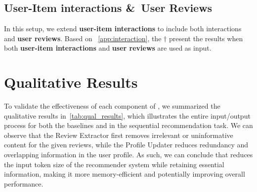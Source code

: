 \subsection{User-Item interactions \&\ User Reviews}
\label{app:combined}
In this setup, we extend \textbf{user-item interactions} to include both interactions and \textbf{user reviews}. Based on ~\cref{app:interaction}, the $\dagger$ present the results when both \textbf{user-item interactions} and \textbf{user reviews} are used as input.



\section{Qualitative Results}
\label{app:qual}
To validate the effectiveness of each component of \myalg{}, we summarized the qualitative results in~\autoref{tab:qual_results}, which illustrates the entire input/output process for both the baselines and \myalg{} in the sequential recommendation task. We can observe that the Review Extractor first removes irrelevant or uninformative content for the given reviews, while the Profile Updater reduces redundancy and overlapping information in the user profile. As such, we can conclude that \myalg{} reduces the input token size of the recommender system while retaining essential information, making it more memory-efficient and potentially improving overall performance.






